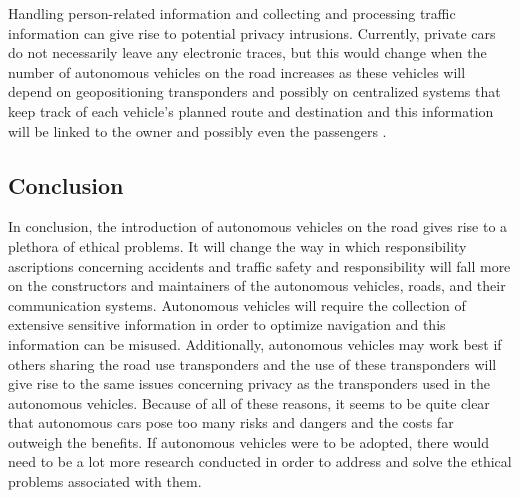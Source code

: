 \documentclass[10pt,twocolumn]{article}
\begin{document}
Handling person-related information and collecting and processing traffic information can give rise to potential privacy intrusions. Currently, private cars do not necessarily leave any electronic traces, but this would change when the number of autonomous vehicles on the road increases as these vehicles will depend on geopositioning transponders and possibly on centralized systems that keep track of each vehicle’s planned route and destination and this information will be linked to the owner and possibly even the passengers \cite{EthicalOverview}.

\subsection{Conclusion}
In conclusion, the introduction of autonomous vehicles on the road gives rise to a plethora of ethical problems. It will change the way in which responsibility ascriptions concerning accidents and traffic safety and responsibility will fall more on the constructors and maintainers of the autonomous vehicles, roads, and their communication systems. Autonomous vehicles will require the collection of extensive sensitive information in order to optimize navigation and this information can be misused. Additionally, autonomous vehicles may work best if others sharing the road use transponders and the use of these transponders will give rise to the same issues concerning privacy as the transponders used in the autonomous vehicles. Because of all of these reasons, it seems to be quite clear that autonomous cars pose too many risks and dangers and the costs far outweigh the benefits. If autonomous vehicles were to be adopted, there would need to be a lot more research conducted in order to address and solve the ethical problems associated with them. 
\end{document}
